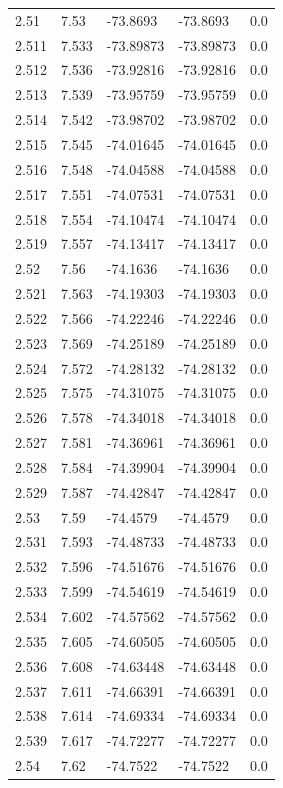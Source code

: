 \begin{tabular}{lllll}
2.51 & 7.53 & -73.8693 & -73.8693 & 0.0 \\
2.511 & 7.533 & -73.89873 & -73.89873 & 0.0 \\
2.512 & 7.536 & -73.92816 & -73.92816 & 0.0 \\
2.513 & 7.539 & -73.95759 & -73.95759 & 0.0 \\
2.514 & 7.542 & -73.98702 & -73.98702 & 0.0 \\
2.515 & 7.545 & -74.01645 & -74.01645 & 0.0 \\
2.516 & 7.548 & -74.04588 & -74.04588 & 0.0 \\
2.517 & 7.551 & -74.07531 & -74.07531 & 0.0 \\
2.518 & 7.554 & -74.10474 & -74.10474 & 0.0 \\
2.519 & 7.557 & -74.13417 & -74.13417 & 0.0 \\
2.52 & 7.56 & -74.1636 & -74.1636 & 0.0 \\
2.521 & 7.563 & -74.19303 & -74.19303 & 0.0 \\
2.522 & 7.566 & -74.22246 & -74.22246 & 0.0 \\
2.523 & 7.569 & -74.25189 & -74.25189 & 0.0 \\
2.524 & 7.572 & -74.28132 & -74.28132 & 0.0 \\
2.525 & 7.575 & -74.31075 & -74.31075 & 0.0 \\
2.526 & 7.578 & -74.34018 & -74.34018 & 0.0 \\
2.527 & 7.581 & -74.36961 & -74.36961 & 0.0 \\
2.528 & 7.584 & -74.39904 & -74.39904 & 0.0 \\
2.529 & 7.587 & -74.42847 & -74.42847 & 0.0 \\
2.53 & 7.59 & -74.4579 & -74.4579 & 0.0 \\
2.531 & 7.593 & -74.48733 & -74.48733 & 0.0 \\
2.532 & 7.596 & -74.51676 & -74.51676 & 0.0 \\
2.533 & 7.599 & -74.54619 & -74.54619 & 0.0 \\
2.534 & 7.602 & -74.57562 & -74.57562 & 0.0 \\
2.535 & 7.605 & -74.60505 & -74.60505 & 0.0 \\
2.536 & 7.608 & -74.63448 & -74.63448 & 0.0 \\
2.537 & 7.611 & -74.66391 & -74.66391 & 0.0 \\
2.538 & 7.614 & -74.69334 & -74.69334 & 0.0 \\
2.539 & 7.617 & -74.72277 & -74.72277 & 0.0 \\
2.54 & 7.62 & -74.7522 & -74.7522 & 0.0 \\

\end{tabular}
